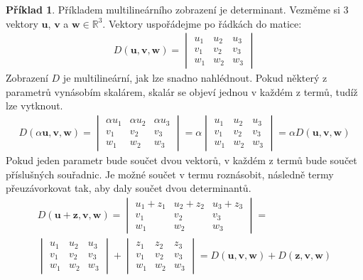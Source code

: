 \documentclass[a5paper,12pt]{amsbook}
\theoremstyle{definition}
\newtheorem{example}{Příklad}[chapter]
\newcommand{\myscalar}[1]{#1}
\newcommand{\myvec}[1]{\bm{#1}}
\newcommand{\myspace}[1]{\mathbb{#1}}
\begin{document}
\begin{example}
Příkladem multilineárního zobrazení je determinant. Vezměme si 3 vektory $\myvec{u}$, 
$\myvec{v}$ a $\myvec{w}\in\myspace{R}^3$. Vektory uspořádejme po řádkách do matice:
\begin{align*}
D(\myvec{u}, \myvec{v}, \myvec{w}) =
\begin{vmatrix}
u_1 & u_2 & u_3 \\
v_1 & v_2 & v_3 \\
w_1 & w_2 & w_3
\end{vmatrix}
\end{align*}
Zobrazení $D$ je multilineární, jak lze snadno nahlédnout. Pokud některý z parametrů
vynásobím skalárem, skalár se objeví jednou v každém z termů, tudíž lze vytknout.
\begin{align*}
D(\myscalar{\alpha}\myvec{u}, \myvec{v}, \myvec{w}) =
\begin{vmatrix}
\myscalar{\alpha}u_1 & \myscalar{\alpha}u_2 & \myscalar{\alpha}u_3 \\
v_1 & v_2 & v_3 \\
w_1 & w_2 & w_3
\end{vmatrix}
=
\myscalar{\alpha}
\begin{vmatrix}
u_1 & u_2 & u_3 \\
v_1 & v_2 & v_3 \\
w_1 & w_2 & w_3
\end{vmatrix}
= \myscalar{\alpha}D(\myvec{u}, \myvec{v}, \myvec{w})
\end{align*}
Pokud jeden parametr bude součet dvou vektorů, v každém z termů bude součet příslušných
souřadnic. Je možné součet v termu roznásobit, následně termy přeuzávorkovat tak,
aby daly součet dvou determinantů.
\begin{align*}
D(\myvec{u} + \myvec{z}, \myvec{v}, \myvec{w}) =
\begin{vmatrix}
u_1 + z_1 & u_2 + z_2 & u_3 + z_3 \\
v_1 & v_2 & v_3 \\
w_1 & w_2 & w_3
\end{vmatrix}
= \\
\begin{vmatrix}
u_1 & u_2 & u_3 \\
v_1 & v_2 & v_3 \\
w_1 & w_2 & w_3
\end{vmatrix}
+
\begin{vmatrix}
z_1 & z_2 & z_3 \\
v_1 & v_2 & v_3 \\
w_1 & w_2 & w_3
\end{vmatrix}
= D(\myvec{u}, \myvec{v}, \myvec{w}) + D(\myvec{z}, \myvec{v}, \myvec{w})
\end{align*}
\end{example}
\end{document}
